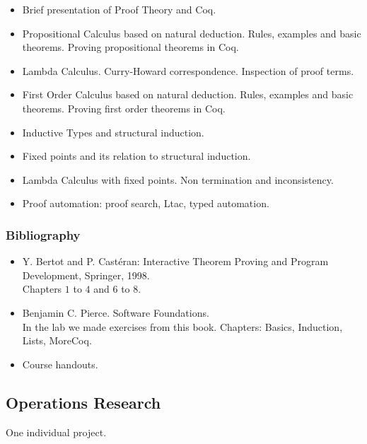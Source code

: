 \documentclass[spanish]{article}
\begin{document}
\begin{itemize}
  \item
    Brief presentation of Proof Theory and Coq.

  \item
    Propositional Calculus based on natural deduction. Rules, examples and basic theorems. Proving
    propositional theorems in Coq.

  \item
    Lambda Calculus. Curry-Howard correspondence. Inspection of proof terms.

  \item
    First Order Calculus based on natural deduction. Rules, examples and basic theorems.
    Proving first order theorems in Coq.

  \item
    Inductive Types and structural induction.

  \item
    Fixed points and its relation to structural induction.

  \item
    Lambda Calculus with fixed points. Non termination and inconsistency.

  \item
    Proof automation: proof search, Ltac, typed automation.

\end{itemize}

\subsubsection{Bibliography}
\begin{itemize}
  \item Y. Bertot and P. Cast\'eran: Interactive Theorem Proving and Program Development, Springer, 1998.\\
    Chapters $1$ to $4$ and $6$ to $8$.

  \item Benjamin C. Pierce. Software Foundations.\\
    In the lab we made exercises from this book. Chapters: Basics, Induction, Lists, MoreCoq.

  \item Course handouts.

\end{itemize}
\hrulefill%

\subsection{Operations Research}
One individual project.
\end{document}
